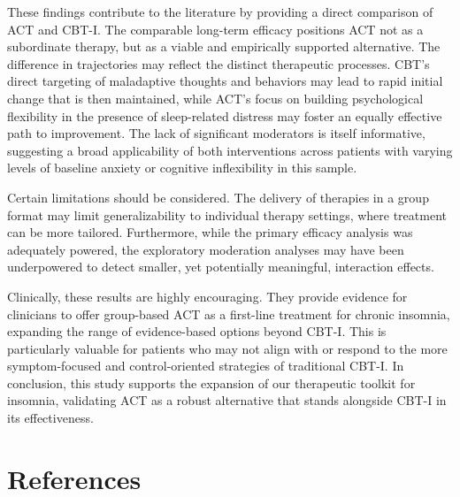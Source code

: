 \documentclass[
  english,
  man]{apa6}
\begin{document}
These findings contribute to the literature by providing a direct comparison of ACT and CBT-I. The comparable long-term efficacy positions ACT not as a subordinate therapy, but as a viable and empirically supported alternative. The difference in trajectories may reflect the distinct therapeutic processes. CBT's direct targeting of maladaptive thoughts and behaviors may lead to rapid initial change that is then maintained, while ACT's focus on building psychological flexibility in the presence of sleep-related distress may foster an equally effective path to improvement. The lack of significant moderators is itself informative, suggesting a broad applicability of both interventions across patients with varying levels of baseline anxiety or cognitive inflexibility in this sample.

Certain limitations should be considered. The delivery of therapies in a group format may limit generalizability to individual therapy settings, where treatment can be more tailored. Furthermore, while the primary efficacy analysis was adequately powered, the exploratory moderation analyses may have been underpowered to detect smaller, yet potentially meaningful, interaction effects.

Clinically, these results are highly encouraging. They provide evidence for clinicians to offer group-based ACT as a first-line treatment for chronic insomnia, expanding the range of evidence-based options beyond CBT-I. This is particularly valuable for patients who may not align with or respond to the more symptom-focused and control-oriented strategies of traditional CBT-I. In conclusion, this study supports the expansion of our therapeutic toolkit for insomnia, validating ACT as a robust alternative that stands alongside CBT-I in its effectiveness.

\newpage

\section{References}\label{references}
\end{document}
